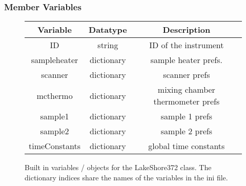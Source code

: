 \documentclass{article}
\begin{document}
\subsubsection{Member Variables}
\begin{figure}[H]
\centering
\begin{tabular}{|c | c | c | }
Variable & Datatype & Description \\ \hline \hline
ID & string & ID of the instrument \\
sampleheater & dictionary & sample heater prefs. \\
scanner & dictionary & scanner prefs \\
mcthermo & dictionary & mixing chamber thermometer prefs\\
sample1 & dictionary & sample 1 prefs\\
sample2 & dictionary &  sample 2 prefs \\
timeConstants & dictionary & global time constants\\ \hline

\end{tabular}
\caption{Built in variables / objects for the LakeShore372 class. The dictionary indices share the names of the variables in the ini file.}
\end{figure}
\end{document}
